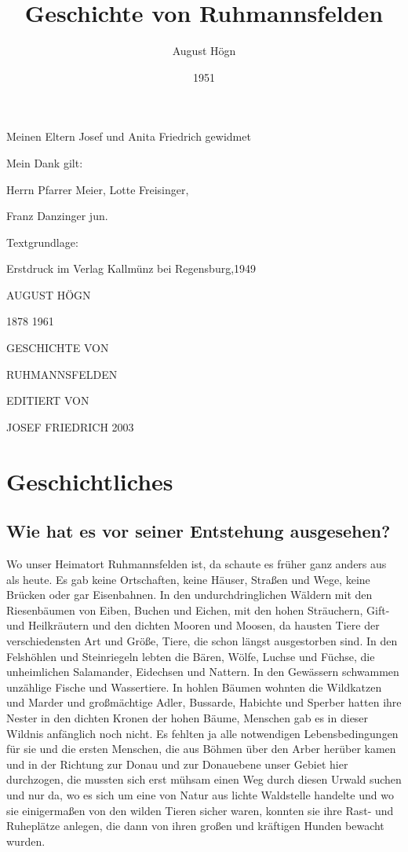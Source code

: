 \documentclass[12pt,a4pager]{book}
\author{August Högn}
\title{Geschichte von Ruhmannsfelden}
\date{1951}
\begin{document}
\maketitle

Meinen Eltern Josef und Anita Friedrich gewidmet

Mein Dank gilt:

Herrn Pfarrer Meier, Lotte Freisinger,

Franz Danzinger jun.

Textgrundlage:

Erstdruck im Verlag Kallmünz bei Regensburg,1949

\tableofcontents

\newpage

AUGUST HÖGN

1878 1961

GESCHICHTE VON

RUHMANNSFELDEN

EDITIERT VON

JOSEF FRIEDRICH 2003

\part{Geschichtliches}

\chapter{Wie hat es vor seiner Entstehung ausgesehen?}

Wo unser Heimatort Ruhmannsfelden ist, da schaute es früher ganz anders aus als
heute. Es gab keine Ortschaften, keine Häuser, Straßen und Wege, keine Brücken
oder gar Eisenbahnen. In den undurchdringlichen Wäldern mit den Riesenbäumen von
Eiben, Buchen und Eichen, mit den hohen Sträuchern, Gift- und Heilkräutern und
den dichten Mooren und Moosen, da hausten Tiere der verschiedensten Art und
Größe, Tiere, die schon längst ausgestorben sind. In den Felshöhlen und
Steinriegeln lebten die Bären, Wölfe, Luchse und Füchse, die unheimlichen
Salamander, Eidechsen und Nattern. In den Gewässern schwammen unzählige Fische
und Wassertiere. In hohlen Bäumen wohnten die Wildkatzen und Marder und
großmächtige Adler, Bussarde, Habichte und Sperber hatten ihre Nester in den
dichten Kronen der hohen Bäume, Menschen gab es in dieser Wildnis anfänglich
noch nicht. Es fehlten ja alle notwendigen Lebensbedingungen für sie und die
ersten Menschen, die aus Böhmen über den Arber herüber kamen und in der Richtung
zur Donau und zur Donauebene unser Gebiet hier durchzogen, die mussten sich erst
mühsam einen Weg durch diesen Urwald suchen und nur da, wo es sich um eine von
Natur aus lichte Waldstelle handelte und wo sie einigermaßen von den wilden
Tieren sicher waren, konnten sie ihre Rast- und Ruheplätze anlegen, die dann von
ihren großen und kräftigen Hunden bewacht wurden.
\end{document}
